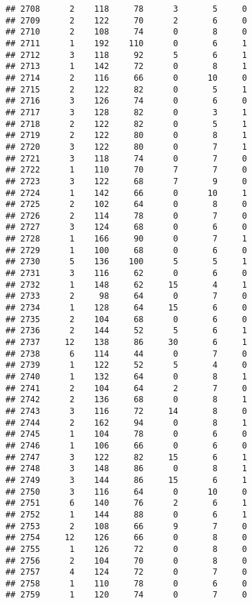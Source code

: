 \documentclass[
]{article}
\begin{document}
\begin{verbatim}
## 2708      2    118     78      3       5     0
## 2709      2    122     70      2       6     0
## 2710      2    108     74      0       8     0
## 2711      1    192    110      0       6     1
## 2712      3    118     92      5       6     1
## 2713      1    142     72      0       8     1
## 2714      2    116     66      0      10     0
## 2715      2    122     82      0       5     1
## 2716      3    126     74      0       6     0
## 2717      3    128     82      0       3     1
## 2718      2    122     82      0       5     1
## 2719      2    122     80      0       8     1
## 2720      3    122     80      0       7     1
## 2721      3    118     74      0       7     0
## 2722      1    110     70      7       7     0
## 2723      3    122     68      7       9     0
## 2724      1    142     66      0      10     1
## 2725      2    102     64      0       8     0
## 2726      2    114     78      0       7     0
## 2727      3    124     68      0       6     0
## 2728      1    166     90      0       7     1
## 2729      1    100     68      0       6     0
## 2730      5    136    100      5       5     1
## 2731      3    116     62      0       6     0
## 2732      1    148     62     15       4     1
## 2733      2     98     64      0       7     0
## 2734      1    128     64     15       6     0
## 2735      2    104     68      0       6     0
## 2736      2    144     52      5       6     1
## 2737     12    138     86     30       6     1
## 2738      6    114     44      0       7     0
## 2739      1    122     52      5       4     0
## 2740      1    132     64      0       8     1
## 2741      2    104     64      2       7     0
## 2742      2    136     68      0       8     1
## 2743      3    116     72     14       8     0
## 2744      2    162     94      0       8     1
## 2745      1    104     78      0       6     0
## 2746      1    106     66      0       6     0
## 2747      3    122     82     15       6     1
## 2748      3    148     86      0       8     1
## 2749      3    144     86     15       6     1
## 2750      3    116     64      0      10     0
## 2751      6    140     76      2       6     1
## 2752      1    144     88      0       6     1
## 2753      2    108     66      9       7     0
## 2754     12    126     66      0       8     0
## 2755      1    126     72      0       8     0
## 2756      2    104     70      0       8     0
## 2757      4    124     72      0       7     0
## 2758      1    110     78      0       6     0
## 2759      1    120     74      0       7     0

\end{verbatim}
\end{document}
